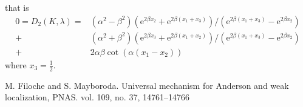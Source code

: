 \documentclass[12pt,a4paper]{article}
\begin{document}
\begin{appendices}
that is
\begin{align*}
0 = D_2(K, \lambda) = & (\alpha^2 - \beta^2)(\mathrm{e}^{2 \beta x_2} + \mathrm{e}^{2 \beta (x_1+x_3)}) / (\mathrm{e}^{2 \beta (x_1+x_3)} - \mathrm{e}^{2 \beta x_2}) \\
+ & (\alpha^2 + \beta^2)(\mathrm{e}^{2 \beta x_3} + \mathrm{e}^{2 \beta (x_1+x_2)}) / (\mathrm{e}^{2 \beta (x_1+x_3)} - \mathrm{e}^{2 \beta x_2}) \\
+ & 2 \alpha \beta \cot(\alpha (x_1 - x_2))
\end{align*}
where $x_3 = \frac12$.

\end{appendices}

\begin{thebibliography}{99} 
 M. Filoche and S. Mayboroda. Universal mechanism for Anderson and weak localization, PNAS. vol. 109, no. 37, 14761–14766
\end{thebibliography}
\end{document}
